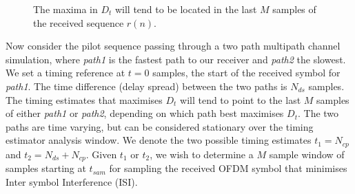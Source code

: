 \documentclass{article}
\begin{document}
\begin{figure} [H]
\caption{The maxima in $D_t$ will tend to be located in the last $M$ samples of the received sequence $r(n)$.}
\vspace{5mm}
\label{fig:dt_max}
\begin{center}

\end{center}
\end{figure}

Now consider the pilot sequence passing through a two path multipath channel simulation, where \emph{path1} is the fastest path to our receiver and \emph{path2} the slowest. We set a timing reference at $t=0$ samples, the start of the received symbol for \emph{path1}. The time difference (delay spread) between the two paths is $N_{ds}$ samples. The timing estimates that maximises $D_t$ will tend to point to the last $M$ samples of either \emph{path1} or \emph{path2}, depending on which path best maximises $D_t$.  The two paths are time varying, but can be considered stationary over the timing estimator analysis window.  We denote the two possible timing estimates $t_1=N_{cp}$ and $t_2=N_{ds}+N_{cp}$. Given $t_1$ or $t_2$, we wish to determine a $M$ sample window of samples starting at $t_{sam}$ for sampling the received OFDM symbol that minimises Inter symbol Interference (ISI).
\end{document}
